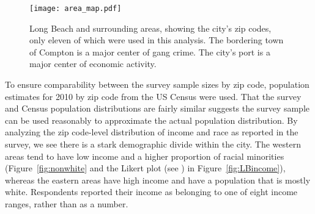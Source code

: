 \begin{figure}
  \centering
  \texttt{[image: area\_map.pdf]}
\caption{Long Beach and surrounding areas, showing the city's zip codes, only eleven of which were used in this analysis.  The bordering town of Compton is a major center of gang crime.  The city's port is a major center of economic activity.}
\label{fig:LBmap}       
\end{figure}

To ensure comparability between the survey sample sizes by zip code, population estimates for 2010 by zip code from the US Census were used.  That the survey and Census population distributions are fairly similar suggests the survey sample can be used reasonably to approximate the actual population distribution.  By analyzing the zip code-level distribution of income and race as reported in the survey, we see there is a stark demographic divide within the city. The western areas tend to have low income and a higher proportion of racial minorities (Figure~\ref{fig:nonwhite} and the Likert plot (see \citealt{HHpackage}) in Figure~\ref{fig:LBincome}), whereas the eastern areas have high income and have a population that is mostly white.  Respondents reported their income as belonging to one of eight income ranges, rather than as a number.


